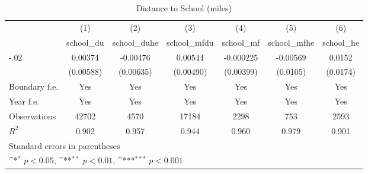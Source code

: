 \begin{table}[htbp]\centering
\def\sym#1{\ifmmode^{#1}\else\(^{#1}\)\fi}
\caption{Distance to School (miles)}
\begin{tabular}{l*{6}{c}}
\hline\hline
                    &\multicolumn{1}{c}{(1)}&\multicolumn{1}{c}{(2)}&\multicolumn{1}{c}{(3)}&\multicolumn{1}{c}{(4)}&\multicolumn{1}{c}{(5)}&\multicolumn{1}{c}{(6)}\\
                    &\multicolumn{1}{c}{school\_du}&\multicolumn{1}{c}{school\_duhe}&\multicolumn{1}{c}{school\_mfdu}&\multicolumn{1}{c}{school\_mf}&\multicolumn{1}{c}{school\_mfhe}&\multicolumn{1}{c}{school\_he}\\
\hline
-.02                &     0.00374         &    -0.00476         &     0.00544         &   -0.000225         &    -0.00569         &      0.0152         \\
                    &   (0.00588)         &   (0.00635)         &   (0.00490)         &   (0.00399)         &    (0.0105)         &    (0.0174)         \\
[1em]
Boundary f.e.       &         Yes         &         Yes         &         Yes         &         Yes         &         Yes         &         Yes         \\
[1em]
Year f.e.           &         Yes         &         Yes         &         Yes         &         Yes         &         Yes         &         Yes         \\
\hline
Observations        &       42702         &        4570         &       17184         &        2298         &         753         &        2593         \\
\(R^{2}\)           &       0.902         &       0.957         &       0.944         &       0.960         &       0.979         &       0.901         \\
\hline\hline
\multicolumn{7}{l}{\footnotesize Standard errors in parentheses}\\
\multicolumn{7}{l}{\footnotesize \sym{*} \(p<0.05\), \sym{**} \(p<0.01\), \sym{***} \(p<0.001\)}\\
\end{tabular}
\end{table}
